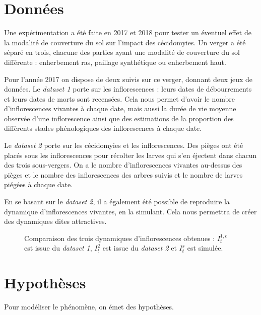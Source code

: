 \documentclass[a4paper, 11pt]{article}
\begin{document}
\section{Données}

Une expérimentation a été faite en 2017 et 2018 pour tester un éventuel effet de la modalité de couverture du sol sur l'impact des cécidomyies. Un verger a été séparé en trois, chacune des parties ayant une modalité de couverture du sol différente : enherbement ras, paillage synthétique ou enherbement haut.

Pour l'année 2017 on dispose de deux suivis sur ce verger, donnant deux jeux de données.
Le \textit{dataset 1} porte sur les inflorescences : leurs dates de débourrements et leurs dates de morts sont recensées.
Cela nous permet d'avoir le nombre d'inflorescences vivantes à chaque date, mais aussi la durée de vie moyenne observée d'une inflorescence ainsi que des estimations de la proportion des différents stades phénologiques des inflorescences à chaque date.

Le \textit{dataset 2} porte sur les cécidomyies et les inflorescences. Des pièges ont été placés sous les inflorescences pour récolter les larves qui s'en éjectent dans chacun des trois sous-vergers. On a le nombre d'inflorescences vivantes au-dessus des pièges et le nombre des inflorescences des arbres suivis et le nombre de larves piégées à chaque date.

En se basant sur le \textit{dataset 2}, il a également été possible de reproduire la dynamique d'inflorescences vivantes, en la simulant. Cela nous permettra de créer des dynamiques dites attractives.

\begin{figure}[ht]
\centering
 \caption{Comparaison des trois dynamiques d'inflorescences obtenues : $I_t^{1, c}$ est issue du \textit{dataset 1}, $I_t^2$ est issue du \textit{dataset 2} et $I_t^s$ est simulée.}
 \label{fig:comp}
\end{figure}



\section{Hypothèses}

Pour modéliser le phénomène, on émet des hypothèses.
\end{document}
